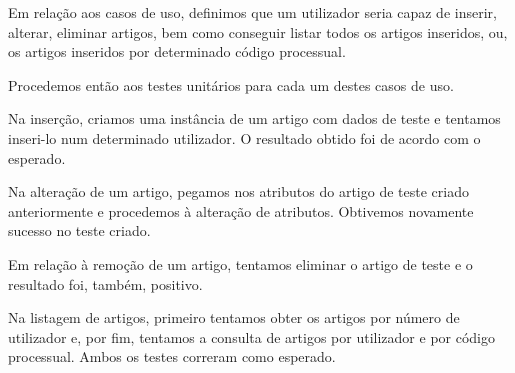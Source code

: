 \indent \par Em relação aos casos de uso, definimos que um utilizador seria capaz de inserir, alterar, eliminar artigos, bem como conseguir listar todos os artigos inseridos, ou, os artigos inseridos por determinado código processual.
\indent \par Procedemos então aos testes unitários para cada um destes casos de uso.
\indent \par Na inserção, criamos uma instância de um artigo com dados de teste e tentamos inseri-lo num determinado utilizador. O resultado obtido foi de acordo com o esperado.
\indent \par Na alteração de um artigo, pegamos nos atributos do artigo de teste criado anteriormente e procedemos à alteração de atributos. Obtivemos novamente sucesso no teste criado.
\indent \par Em relação à remoção de um artigo, tentamos eliminar o artigo de teste e o resultado foi, também, positivo.
\indent \par Na listagem de artigos, primeiro tentamos obter os artigos por número de utilizador e, por fim, tentamos a consulta de artigos por utilizador e por código processual. Ambos os testes correram como esperado.

